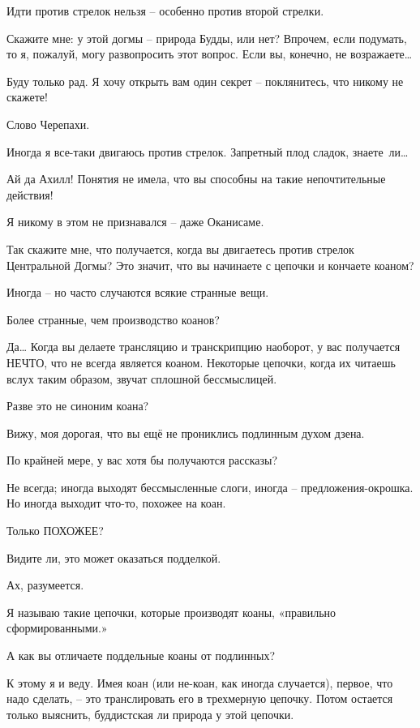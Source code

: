 \documentclass[../main.tex]{subfiles}
\begin{document}
\begin{dialogue}
Идти против стрелок нельзя \--- особенно против второй стрелки.

 Скажите мне: у этой догмы \--- природа Будды, или нет? Впрочем, если подумать, то я, пожалуй, могу развопросить этот вопрос. Если вы, конечно, не возражаете\ldots{}

 Буду только рад. Я хочу открыть вам один секрет \--- поклянитесь, что никому не скажете!

 Слово Черепахи.

 Иногда я все-таки двигаюсь против стрелок. Запретный плод сладок, знаете~ли\ldots{}

 Ай да Ахилл! Понятия не имела, что вы способны на такие непочтительные действия!

 Я никому в этом не признавался \--- даже Оканисаме.

 Так скажите мне, что получается, когда вы двигаетесь против стрелок Центральной Догмы? Это значит, что вы начинаете с цепочки и кончаете коаном?

 Иногда \--- но часто случаются всякие странные вещи.

 Более странные, чем производство коанов?

 Да\ldots{} Когда вы делаете трансляцию и транскрипцию наоборот, у вас получается НЕЧТО, что не всегда является коаном. Некоторые цепочки, когда их читаешь вслух таким образом, звучат сплошной бессмыслицей.

 Разве это не синоним коана?

 Вижу, моя дорогая, что вы ещё не прониклись подлинным духом дзена.

 По крайней мере, у вас хотя бы получаются рассказы?

 Не всегда; иногда выходят бессмысленные слоги, иногда \--- предложения-окрошка. Но иногда выходит что-то, похожее на коан.

 Только ПОХОЖЕЕ?

 Видите ли, это может оказаться подделкой.

 Ах, разумеется.

 Я называю такие цепочки, которые производят коаны, «правильно сформированными.»

 А как вы отличаете поддельные коаны от подлинных?

 К этому я и веду. Имея коан (или не-коан, как иногда случается), первое, что надо сделать, \--- это транслировать его в трехмерную цепочку. Потом остается только выяснить, буддистская ли природа у этой цепочки.


\end{dialogue}
\end{document}
